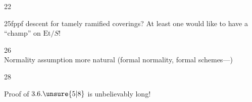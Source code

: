 22

25\quad fppf descent for tamely ramified coverings?
At least one would like to have a ``champ'' on $\mathrm{Et}/S$!

26\quad {}\\
\hspace*{2em} Normality assumption more natural
(formal normality,  formal schemes---)

28\quad{}


Proof of $3.6.\unsure{5|8}$ is unbelievably long!


